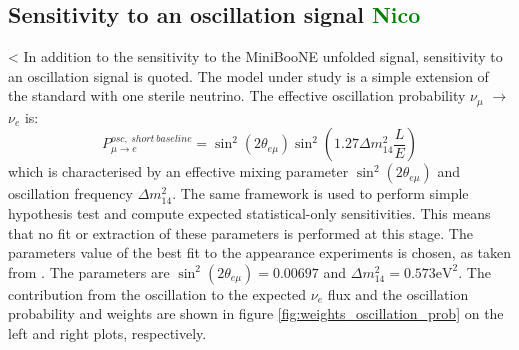 \documentclass[a4paper]{article}
\newcommand{\nue}{$\nu_e$ }
\newcommand{\numu}{$\nu_{\mu}$ }
\begin{document}
\subsection{Sensitivity to an oscillation signal \textcolor{green}{Nico}}
<
In addition to the sensitivity to the MiniBooNE unfolded signal, sensitivity to an oscillation signal is quoted.
The model under study is a simple extension of the standard with one sterile neutrino.
The effective oscillation probability \numu $\rightarrow$ \nue is:
\begin{equation}
    P^{osc,~short~baseline}_{\mu \rightarrow e} = \sin^2(2\theta_{e \mu}) \sin^2 \left( 1.27 \Delta m_{14}^2 \frac{L}{E} \right)
\end{equation}
which is characterised by an effective mixing parameter $\sin^2(2\theta_{e \mu})$ and oscillation frequency $\Delta m_{14}^2$.
The same framework is used to perform simple hypothesis test and compute expected statistical-only sensitivities.
This means that no fit or extraction of these parameters is performed at this stage. 
The parameters value of the best fit to the appearance experiments is chosen, as taken from \cite{bib:oscillation_parameters}.
The parameters are $\sin^2(2\theta_{e \mu}) = 0.00697$ and $\Delta m_{14}^2 = 0.573 \text{eV}^2$.
The contribution from the oscillation to the expected \nue flux and the oscillation probability and weights are shown in figure \ref{fig:weights_oscillation_prob} on the left and right plots, respectively.
\end{document}
